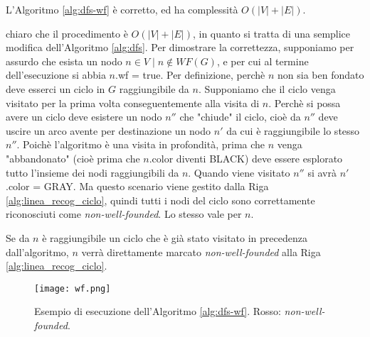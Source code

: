\begin{observation}
    L'Algoritmo \ref{alg:dfs-wf} è corretto, ed ha complessità $O(|V| + |E|)$.
\end{observation}
\begin{proof2}
    \accente chiaro che il procedimento è $O(|V| + |E|)$, in quanto si tratta di una semplice modifica dell'Algoritmo \ref{alg:dfs}. Per dimostrare la correttezza, supponiamo per assurdo che esista un nodo $n \in V \mid n \not\in WF(G)$, e per cui al termine dell'esecuzione si abbia $n$.wf = true. Per definizione, perchè $n$ non sia ben fondato deve esserci un ciclo in $G$ raggiungibile da $n$. Supponiamo che il ciclo venga visitato per la prima volta conseguentemente alla visita di $n$. Perchè si possa avere un ciclo deve esistere un nodo $n''$ che "chiude" il ciclo, cioè da $n''$ deve uscire un arco avente per destinazione un nodo $n'$ da cui è raggiungibile lo stesso $n''$. Poichè l'algoritmo è una visita in profondità, prima che $n$ venga "abbandonato" (cioè prima che $n$.color diventi BLACK) deve essere esplorato tutto l'insieme dei nodi raggiungibili da $n$. Quando viene visitato $n''$ si avrà $n'$.color = GRAY. Ma questo scenario viene gestito dalla Riga \ref{alg:linea_recog_ciclo}, quindi tutti i nodi del ciclo sono correttamente riconosciuti come \emph{non-well-founded}. Lo stesso vale per $n$.

    Se da $n$ è raggiungibile un ciclo che è già stato visitato in precedenza dall'algoritmo, $n$ verrà direttamente marcato \emph{non-well-founded} alla Riga \ref{alg:linea_recog_ciclo}.
\end{proof2}
\begin{figure}[H]
    \centering
    \texttt{[image: wf.png]}
    \caption{Esempio di esecuzione dell'Algoritmo \ref{alg:dfs-wf}. Rosso: \emph{non-well-founded}.}
\end{figure}

